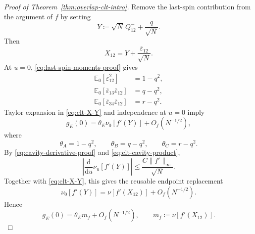 \documentclass[11pt]{article}
\numberwithin{equation}{section}
\newcommand{\1}{\mathbf 1}
\begin{document}
\begin{proof}[Proof of Theorem~\ref{thm:overlap-clt-intro}]
Remove the last-spin contribution from the argument of $f$ by setting
\begin{equation}
 Y\coloneqq\sqrt N\,Q^-_{12}+\frac q{\sqrt N}.
 \label{eq:clt-Yminus}
\end{equation}
Then
\begin{equation}
 X_{12}=Y+\frac{\overline\varepsilon_{12}}{\sqrt N}.
 \label{eq:clt-X-Y}
\end{equation}
At $u=0$, \eqref{eq:last-spin-moments-proof} gives
\begin{align}
 \mathbb E_0[\overline\varepsilon_{12}^2]
 &=1-q^2,
 \label{eq:clt-source-A}\\
 \mathbb E_0[\overline\varepsilon_{13}\overline\varepsilon_{12}]
 &=q-q^2,
 \label{eq:clt-source-B}\\
 \mathbb E_0[\overline\varepsilon_{34}\overline\varepsilon_{12}]
 &=r-q^2.
 \label{eq:clt-source-C}
\end{align}
Taylor expansion in \eqref{eq:clt-X-Y} and independence at $u=0$ imply
\begin{equation}
 g_E(0)=\theta_E\nu_0[f'(Y)]+O_f(N^{-1/2}),
 \label{eq:clt-g-zero-pre}
\end{equation}
where
\begin{equation}
 \theta_A=1-q^2,\qquad
 \theta_B=q-q^2,\qquad
 \theta_C=r-q^2.
 \label{eq:clt-theta}
\end{equation}
By \eqref{eq:cavity-derivative-proof} and
\eqref{eq:clt-cavity-product},
\[
 \left|\frac{\mathrm d}{\mathrm du}\nu_u[f'(Y)]\right|
 \le\frac{C\|f'\|_\infty}{\sqrt N}.
\]
Together with \eqref{eq:clt-X-Y}, this gives the reusable endpoint
replacement
\begin{equation}
 \nu_0[f'(Y)]=\nu[f'(X_{12})]+O_f(N^{-1/2}).
 \label{eq:clt-derivative-endpoint-replacement}
\end{equation}
Hence
\begin{equation}
 g_E(0)=\theta_E m_f+O_f(N^{-1/2}),
 \qquad m_f\coloneqq\nu[f'(X_{12})].
 \label{eq:clt-g-zero}
\end{equation}


\end{proof}
\end{document}
